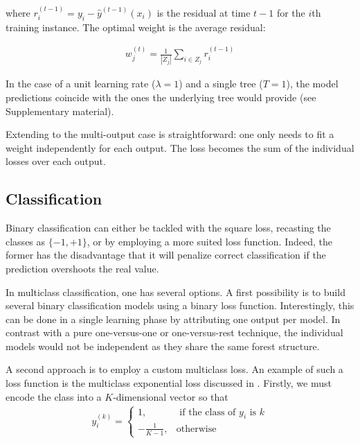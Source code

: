 \documentclass{article}
\begin{document}
where $r_i^{(t-1)} = y_i - \hat{y}^{(t-1)}(x_i)$ is the residual at time $t-1$ 
for the $i$th training instance.
The optimal weight is the average residual:

\vspace*{-\baselineskip}
\begin{align}\label{eq:L2Solution}
w_j^{(t)} = \frac{1}{|Z_j|} \sum_{i \in Z_j} r_i^{(t-1)}
\end{align}
\vspace*{-\baselineskip}

In the case of a unit learning rate ($\lambda = 1$) and a single tree ($T=1$), 
the model predictions coincide with the ones the underlying tree would provide 
(see Supplementary material).

Extending to the multi-output case is straightforward: one only needs to fit a 
weight independently for each output. The loss becomes the sum of the 
individual losses over each output.

\subsection{Classification}
\label{subsec:classification}

Binary classification can either be tackled with the square loss, recasting the 
classes as $\{-1, +1\}$, or by employing a more suited loss function. Indeed, 
the former has the disadvantage that it will penalize correct classification if 
the prediction overshoots the real value.

In multiclass classification, one has several options. A first possibility is 
to build several binary classification models using a binary loss function. 
Interestingly, this can be done in a single learning phase by attributing one 
output per model. In contrast with a pure one-versus-one or one-versus-rest 
technique, the individual models would not be independent as they share the 
same forest structure.

A second approach is to employ a custom multiclass loss. An example of such a 
loss function is the multiclass exponential loss discussed in 
\cite{zhu2009multiadaboost}. Firstly, we must encode the class into a 
$K$-dimensional vector so that
\begin{align}\label{eq:MEencode}
y_i^{(k)} = \begin{cases}
1, &\text{ if the class of } y_i \text{ is } k \\
-\frac{1}{K-1}, &\text{otherwise}
\end{cases}
\end{align}
\vspace*{-\baselineskip}
\end{document}
